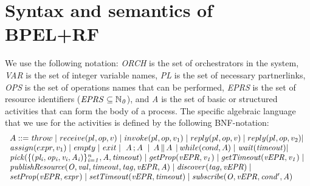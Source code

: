 \section{Syntax and semantics of BPEL+RF}\label{ops}
We use the following notation: {\it ORCH} is the set of orchestrators in the system, {\it VAR} is the set of integer variable names, {\it PL} is the set of necessary partnerlinks, {\it OPS} is the set of operations names that can be performed, {\it EPRS} is the set of resource identifiers (${\it EPRS\subseteq\mathbb{N}_{0}}$), and {\it A} is the set of basic or structured activities that can form the body of a process. The specific algebraic language that we use
for the activities is defined by the following BNF-notation:
%
\[\begin{array}{l}
  A ::=  {\mathit throw} \;|\;           %
         {\mathit receive(pl,op,v)} \;|\;  %
         {\mathit invoke(pl,op,v_1)} \;|\;
         {\mathit reply(pl,op,v)}\;|\;  %
         {\mathit \overline{reply(pl,op,v_2)}}\hspace{-0.1cm}\;|\;\\
         {\mathit assign(expr,v_1)} \;|\;
         {\mathit empty}\;|\;
         {\mathit exit}\;|\;
         \,\,A \,; A \,\, \;|\, %
         \;A \,\| \, A \;\,|\,   %
         {\mathit while(cond,A)}\;|\ 
         {\it wait(timeout)}\hspace{-0.1cm}\;|\;\\
         {\it pick(\{(pl_i,op_i,v_i,A_i)\}_{i=1}^n,A,timeout)}\;|\;
         {\it getProp(vEPR,v_1)}\;|\;
         {\it getTimeout(vEPR,v_1)}\;|\;\\
         {\it publishResource(O,val,timeout,tag,vEPR,A)}\;|\;
         {\it discover(tag,vEPR)}\;|\;\\
         {\it setProp(vEPR,expr)}\;|\;
         {\it setTimeout(vEPR,timeout)}\;|\;
         {\it subscribe(O,vEPR,cond',A)}
\end{array}
\]

